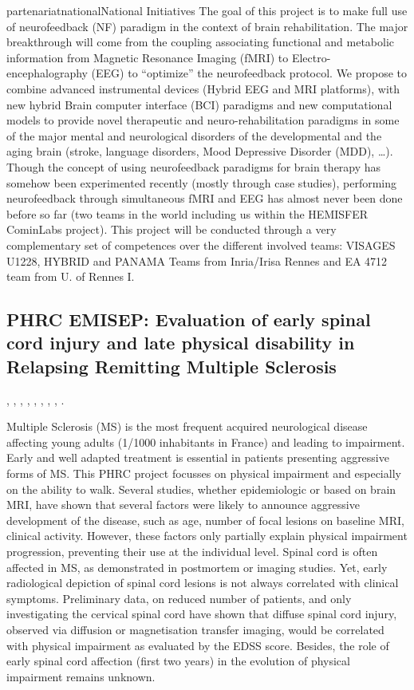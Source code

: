 \documentclass{ra2018}
\begin{document}
\begin{module}{partenariat}{national}{National Initiatives}
        The goal of this project is to make full use of neurofeedback (NF) paradigm in the context of brain
rehabilitation. The major breakthrough will come from the coupling associating functional and
metabolic information from Magnetic Resonance Imaging (fMRI) to Electro-encephalography (EEG)
to “optimize” the neurofeedback protocol. We propose to combine advanced instrumental devices
(Hybrid EEG and MRI platforms), with new hybrid Brain computer interface (BCI) paradigms and
new computational models to provide novel therapeutic and neuro-rehabilitation paradigms in
some of the major mental and neurological disorders of the developmental and the aging brain
(stroke, language disorders, Mood Depressive Disorder (MDD), …). Though the concept of using
neurofeedback paradigms for brain therapy has somehow been experimented recently (mostly
through case studies), performing neurofeedback through simultaneous fMRI and EEG has almost
never been done before so far (two teams in the world including us within the HEMISFER CominLabs project).
This project will be conducted through a very complementary set of competences over the different
involved teams: VISAGES U1228, HYBRID and PANAMA Teams from Inria/Irisa Rennes and EA 4712
team from U. of Rennes I.

  \subsection{PHRC EMISEP: Evaluation of early spinal cord injury and late
	physical disability in Relapsing Remitting Multiple Sclerosis}
\begin{participants}
	, 
	,
	,
	,
	, 
	, 
	,
	,
	.
\end{participants}
Multiple Sclerosis (MS) is the most frequent acquired neurological disease
affecting young adults (1/1000 inhabitants in France)  and leading to
impairment.  Early and well adapted treatment is essential in patients
presenting aggressive forms of MS. This PHRC project focusses on physical
impairment and especially on the ability to walk. Several studies, whether
epidemiologic or based on brain MRI, have shown that several factors were likely
to announce aggressive development of the disease, such as age, number of focal
lesions on baseline MRI, clinical activity. However, these factors only
partially explain physical impairment progression, preventing their use at the
individual level. Spinal cord is often affected in MS, as demonstrated in
postmortem or imaging studies.  Yet, early radiological depiction of spinal
cord lesions is not always correlated with clinical symptoms. Preliminary data,
on reduced number of patients, and only investigating the cervical spinal cord
have shown that diffuse spinal cord injury, observed via diffusion or
magnetisation transfer imaging, would be correlated with physical impairment as
evaluated by the EDSS score. Besides, the role of early spinal cord affection
(first two years) in the evolution of physical impairment remains unknown.


\end{module}
\end{document}
